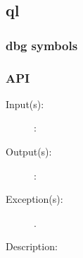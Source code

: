 %
%
%
%
%              

\subsection{ql}
\label{ql}

\subsubsection{dbg symbols}

\subsubsection{API}
\begin{description}
\label{ql_}
\item[{\cfunc[]{ql\_}{}}: ]
	\begin{description}\item[]
	\item[Input(s): ]
		\begin{description}\item[]
		\item[: ]
		\end{description}
	\item[Output(s): ]
		\begin{description}\item[]
		\item[: ]
		\end{description}
	\item[Exception(s): ]
		\begin{description}\item[]
		\item[.]
		\end{description}
	\item[Description: ]
	\end{description}
\end{description}
